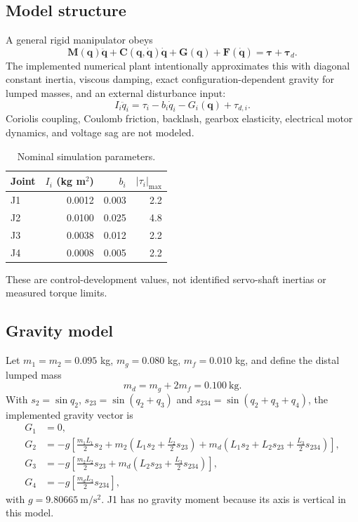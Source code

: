 \documentclass[11pt,a4paper]{article}
\newcommand{\vect}[1]{\bm{#1}}
\begin{document}
\subsection{Model structure}
A general rigid manipulator obeys
\begin{equation}
\vect M(\vect q)\ddot{\vect q}
+\vect C(\vect q,\dot{\vect q})\dot{\vect q}
+\vect G(\vect q)+\vect F(\dot{\vect q})
=\vect\tau+\vect\tau_d.
\label{eq:full-dynamics}
\end{equation}
The implemented numerical plant intentionally approximates this with diagonal
constant inertia, viscous damping, exact configuration-dependent gravity for
lumped masses, and an external disturbance input:
\begin{equation}
\boxed{
I_i\ddot q_i=\tau_i-b_i\dot q_i-G_i(\vect q)+\tau_{d,i}.}
\label{eq:plant}
\end{equation}
Coriolis coupling, Coulomb friction, backlash, gearbox elasticity, electrical
motor dynamics, and voltage sag are not modeled.

\begin{table}[h]
\centering
\caption{Nominal simulation parameters.}
\begin{tabular}{lrrr}
\toprule Joint & $I_i$ (kg m$^2$) & $b_i$ & $|\tau_i|_{\max}$\\\midrule
J1 & 0.0012 & 0.003 & 2.2\\
J2 & 0.0100 & 0.025 & 4.8\\
J3 & 0.0038 & 0.012 & 2.2\\
J4 & 0.0008 & 0.005 & 2.2\\\bottomrule
\end{tabular}
\end{table}
These are control-development values, not identified servo-shaft inertias or
measured torque limits.

\subsection{Gravity model}
Let $m_1=m_2=0.095$ kg, $m_g=0.080$ kg, $m_f=0.010$ kg, and define the distal
lumped mass
\[
m_d=m_g+2m_f=0.100\ \mathrm{kg}.
\]
With $s_2=\sin q_2$, $s_{23}=\sin(q_2+q_3)$ and
$s_{234}=\sin(q_2+q_3+q_4)$, the implemented gravity vector is
\begin{align}
G_1 &=0,\\
G_2 &=-g\left[
\frac{m_1L_1}{2}s_2
+m_2\left(L_1s_2+\frac{L_2}{2}s_{23}\right)
+m_d\left(L_1s_2+L_2s_{23}+\frac{L_3}{2}s_{234}\right)
\right],\\
G_3 &=-g\left[
\frac{m_2L_2}{2}s_{23}
+m_d\left(L_2s_{23}+\frac{L_3}{2}s_{234}\right)
\right],\\
G_4 &=-g\left[\frac{m_dL_3}{2}s_{234}\right],
\end{align}
with $g=9.80665\ \mathrm{m/s^2}$. J1 has no gravity moment because its axis is
vertical in this model.
\end{document}
